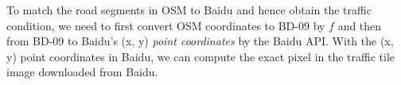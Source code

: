 %

To match the road segments in OSM to  Baidu and hence
obtain the traffic condition, we need to first convert OSM coordinates
to BD-09 by $f$ and then from BD-09 to Baidu's (x, y) 
{\em point coordinates} by the Baidu API. 
%
%
With the (x, y) point coordinates in Baidu, we can compute the exact
pixel in the traffic tile image downloaded from Baidu. 
%

%

